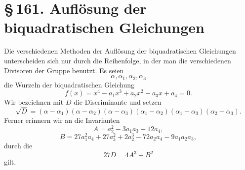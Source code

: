 \documentclass[11pt]{article}
\providecommand{\sect}[2]{\section*{\S\,#1. #2}}
\begin{document}
\sect{161}{Auflösung der biquadratischen Gleichungen}

Die verschiedenen Methoden der Auflösung der biquadratischen Gleichungen unterscheiden sich nur durch die Reihenfolge, in der man die verschiedenen Divisoren der Gruppe benutzt. Es seien
\[
        \alpha,\alpha_1,\alpha_2,\alpha_3
\]
die Wurzeln der biquadratischen Gleichung
\[
        f(x)=x^4-a_1x^3+a_2x^2-a_3x+a_4=0.        \tag{1}
\]
Wir bezeichnen mit $D$ die Discriminante und setzen
\[
 \sqrt D=(\alpha-\alpha_1)(\alpha-\alpha_2)(\alpha-\alpha_3)
(\alpha_1-\alpha_2)(\alpha_1-\alpha_3)(\alpha_2-\alpha_3).        \tag{2}
\]
Ferner erinnern wir an die Invarianten
\[
        A=a_2^2-3a_1a_3+12a_4,                                      \tag{3}
\]
\[
        B=27a_1^2a_4+27a_3^2+2a_2^3-72a_2a_4-9a_1a_2a_3,              \tag{4}
\]
durch die
\[
        27D=4A^3-B^2                                                   \tag{5}
\]
gilt.
\end{document}
